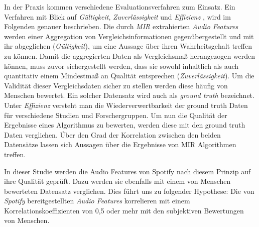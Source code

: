 In der Praxis kommen verschiedene Evaluationsverfahren zum Einsatz.
Ein Verfahren mit Blick auf \textit{Gültigkeit}, \textit{Zuverlässigkeit} und \textit{Effizienz} \cite{Urbano_2013}, wird im Folgenden genauer beschrieben.
Die durch \textit{MIR} extrahierten \textit{Audio Features} werden einer Aggregation von Vergleichsinformationen gegenübergestellt und mit ihr abgeglichen (\textit{Gültigkeit}), um eine Aussage über ihren Wahrheitsgehalt treffen zu können.
Damit die aggregierten Daten als Vergleichsmaß herangezogen werden können, muss zuvor sichergestellt werden, dass sie sowohl inhaltlich als auch quantitativ einem Mindestmaß an Qualität entsprechen (\textit{Zuverlässigkeit}).
Um die Validität dieser Vergleichsdaten sicher zu stellen werden diese häufig von Menschen bewertet.
Ein solcher Datensatz wird auch als \textit{ground truth} bezeichnet.
Unter \textit{Effizienz} versteht man die Wiederverwertbarkeit der ground truth Daten für verschiedene Studien und Forschergruppen.
Um nun die Qualität der Ergebnisse eines Algorithmus zu bewerten, werden diese mit den ground truth Daten verglichen.
Über den Grad der Korrelation zwischen den beiden Datensätze lassen sich Aussagen über die Ergebnisse von MIR Algorithmen treffen.

In dieser Studie werden die Audio Features von Spotify nach diesem Prinzip auf ihre Qualität geprüft.
Dazu werden sie ebenfalls mit einem von Menschen bewerteten Datensatz verglichen.
Dies führt uns zu folgender Hypothese:
Die von \textit{Spotify} bereitgestellten \textit{Audio Features} korrelieren mit einem Korrelationskoeffizienten von 0,5 oder mehr mit den subjektiven Bewertungen von Menschen.
